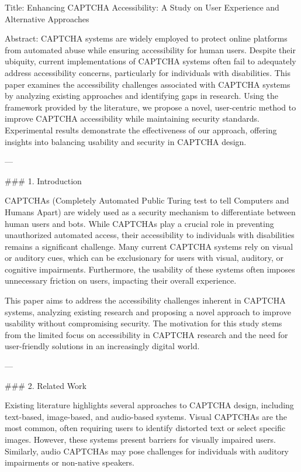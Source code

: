 Title: Enhancing CAPTCHA Accessibility: A Study on User Experience and Alternative Approaches

Abstract:  
CAPTCHA systems are widely employed to protect online platforms from automated abuse while ensuring accessibility for human users. Despite their ubiquity, current implementations of CAPTCHA systems often fail to adequately address accessibility concerns, particularly for individuals with disabilities. This paper examines the accessibility challenges associated with CAPTCHA systems by analyzing existing approaches and identifying gaps in research. Using the framework provided by the literature, we propose a novel, user-centric method to improve CAPTCHA accessibility while maintaining security standards. Experimental results demonstrate the effectiveness of our approach, offering insights into balancing usability and security in CAPTCHA design.

---

### 1. Introduction  

CAPTCHAs (Completely Automated Public Turing test to tell Computers and Humans Apart) are widely used as a security mechanism to differentiate between human users and bots. While CAPTCHAs play a crucial role in preventing unauthorized automated access, their accessibility to individuals with disabilities remains a significant challenge. Many current CAPTCHA systems rely on visual or auditory cues, which can be exclusionary for users with visual, auditory, or cognitive impairments. Furthermore, the usability of these systems often imposes unnecessary friction on users, impacting their overall experience.  

This paper aims to address the accessibility challenges inherent in CAPTCHA systems, analyzing existing research and proposing a novel approach to improve usability without compromising security. The motivation for this study stems from the limited focus on accessibility in CAPTCHA research and the need for user-friendly solutions in an increasingly digital world.

---

### 2. Related Work  

Existing literature highlights several approaches to CAPTCHA design, including text-based, image-based, and audio-based systems. Visual CAPTCHAs are the most common, often requiring users to identify distorted text or select specific images. However, these systems present barriers for visually impaired users. Similarly, audio CAPTCHAs may pose challenges for individuals with auditory impairments or non-native speakers.  

